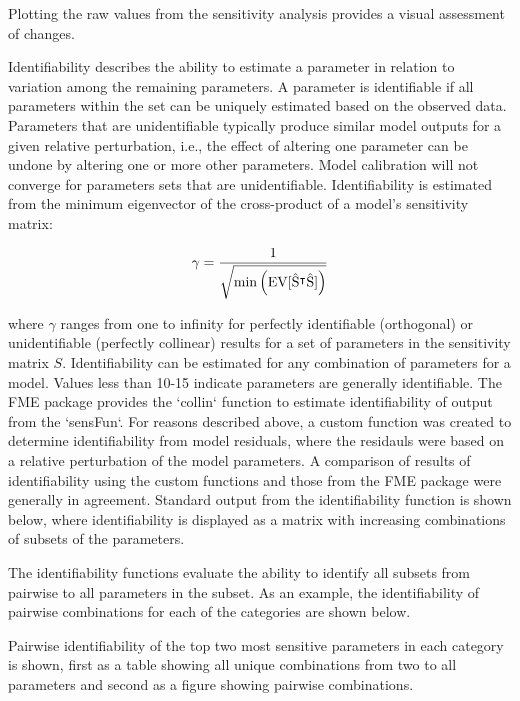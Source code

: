 \documentclass[letterpaper,12pt,oneside]{article}\usepackage[]{graphicx}\usepackage[]{color}
\begin{document}
Plotting the raw values from the sensitivity analysis provides a visual assessment of changes.



Identifiability describes the ability to estimate a parameter in relation to variation among the remaining parameters.  A parameter is identifiable if all parameters within the set can be uniquely estimated based on the observed data.  Parameters that are unidentifiable typically produce similar model outputs for a given relative perturbation, i.e., the effect of altering one parameter can be undone by altering one or more other parameters.  Model calibration will not converge for parameters sets that are unidentifiable.  Identifiability is estimated from the minimum eigenvector of the cross-product of a model's sensitivity matrix:

\begin{equation}
\gamma = \frac{1} {\sqrt{ \min \left(\rm{EV}[\hat{S}^\intercal \hat{S}]\right)}}
\end{equation}

where $\gamma$ ranges from one to infinity for perfectly identifiable (orthogonal) or unidentifiable (perfectly collinear) results for a set of parameters in the sensitivity matrix $S$.  Identifiability can be estimated for any combination of parameters for a model.  Values less than 10-15 indicate parameters are generally identifiable.  The FME package provides the `collin` function to estimate identifiability of output from the `sensFun`.  For reasons described above, a custom function was created to determine identifiability from model residuals, where the residauls were based on a relative perturbation of the model parameters.  A comparison of results of identifiability using the custom functions and those from the FME package were generally in agreement.  Standard output from the identifiability function is shown below, where identifiability is displayed as a matrix with increasing combinations of subsets of the parameters.    



The identifiability functions evaluate the ability to identify all subsets from pairwise to all parameters in the subset.  As an example, the identifiability of pairwise combinations for each of the categories are shown below.



Pairwise identifiability of the top two most sensitive parameters in each category is shown, first as a table showing all unique combinations from two to all parameters and second as a figure showing pairwise combinations.
\end{document}
